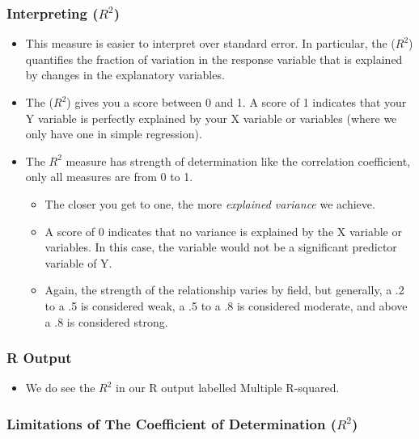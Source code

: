 \documentclass[
  letterpaper,
  DIV=11,
  numbers=noendperiod]{scrreprt}
\providecommand{\tightlist}{%
  \setlength{\itemsep}{0pt}\setlength{\parskip}{0pt}}\usepackage{longtable,booktabs,array}
\begin{document}
\subsubsection{\texorpdfstring{Interpreting
(\(R^2\))}{Interpreting (R\^{}2)}}\label{interpreting-r2}

\begin{itemize}
\tightlist
\item
  This measure is easier to interpret over standard error. In
  particular, the (\(R^2\)) quantifies the fraction of variation in the
  response variable that is explained by changes in the explanatory
  variables.
\item
  The (\(R^2\)) gives you a score between 0 and 1. A score of 1
  indicates that your Y variable is perfectly explained by your X
  variable or variables (where we only have one in simple regression).
\item
  The \(R^2\) measure has strength of determination like the correlation
  coefficient, only all measures are from 0 to 1.

  \begin{itemize}
  \tightlist
  \item
    The closer you get to one, the more \emph{explained variance} we
    achieve.
  \item
    A score of 0 indicates that no variance is explained by the X
    variable or variables. In this case, the variable would not be a
    significant predictor variable of Y.
  \item
    Again, the strength of the relationship varies by field, but
    generally, a .2 to a .5 is considered weak, a .5 to a .8 is
    considered moderate, and above a .8 is considered strong.
  \end{itemize}
\end{itemize}

\subsubsection{R Output}\label{r-output}

\begin{itemize}
\tightlist
\item
  We do see the \(R^2\) in our R output labelled Multiple R-squared.
\end{itemize}

\subsubsection{\texorpdfstring{Limitations of The Coefficient of
Determination
(\(R^2\))}{Limitations of The Coefficient of Determination (R\^{}2)}}\label{limitations-of-the-coefficient-of-determination-r2}
\end{document}
